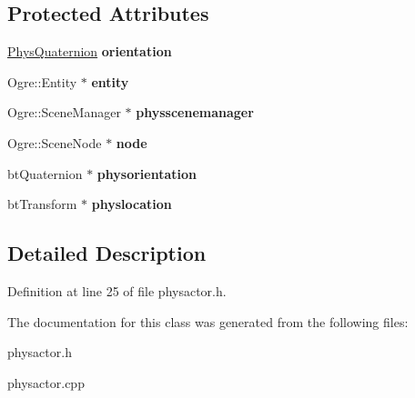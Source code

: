 \subsection*{Protected Attributes}
\begin{DoxyCompactItemize}
\item 
\hypertarget{classActorBase_aececd39ceec6f8843bbc971afe94c1da}{
\hyperlink{classPhysQuaternion}{PhysQuaternion} {\bfseries orientation}}
\label{dd/d7b/classActorBase_aececd39ceec6f8843bbc971afe94c1da}

\item 
\hypertarget{classActorBase_ada6ceb752605b29357b6c5d53c477696}{
Ogre::Entity $\ast$ {\bfseries entity}}
\label{dd/d7b/classActorBase_ada6ceb752605b29357b6c5d53c477696}

\item 
\hypertarget{classActorBase_ad3739eb7f632f0ceb9397d6c699623cd}{
Ogre::SceneManager $\ast$ {\bfseries physscenemanager}}
\label{dd/d7b/classActorBase_ad3739eb7f632f0ceb9397d6c699623cd}

\item 
\hypertarget{classActorBase_affa8851ae622e1d420afa4770ab89ea4}{
Ogre::SceneNode $\ast$ {\bfseries node}}
\label{dd/d7b/classActorBase_affa8851ae622e1d420afa4770ab89ea4}

\item 
\hypertarget{classActorBase_aa7c1bfbc3c985ce98ac780b537097c12}{
btQuaternion $\ast$ {\bfseries physorientation}}
\label{dd/d7b/classActorBase_aa7c1bfbc3c985ce98ac780b537097c12}

\item 
\hypertarget{classActorBase_af0323e5bfc6d189ee09abc915d4b4ca5}{
btTransform $\ast$ {\bfseries physlocation}}
\label{dd/d7b/classActorBase_af0323e5bfc6d189ee09abc915d4b4ca5}

\end{DoxyCompactItemize}


\subsection{Detailed Description}


Definition at line 25 of file physactor.h.

The documentation for this class was generated from the following files:\begin{DoxyCompactItemize}
\item 
physactor.h\item 
physactor.cpp\end{DoxyCompactItemize}
